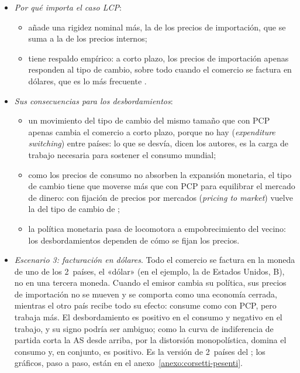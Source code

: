 \documentclass[11pt]{article}
\begin{document}
\begin{itemize}
\item \emph{Por qué importa el caso LCP}:
  \begin{itemize}
  \item añade una rigidez nominal más, la de los precios de importación, que se suma a la de los precios internos;
  \item tiene respaldo empírico: a corto plazo, los precios de importación apenas responden al tipo de cambio, sobre todo cuando el comercio se factura en dólares, que es lo más frecuente\nocite{Gopinath2020DCP} .
  \end{itemize}
\item \emph{Sus consecuencias para los desbordamientos}:
  \begin{itemize}
  \item un movimiento del tipo de cambio del mismo tamaño que con PCP apenas cambia el comercio a corto plazo, porque no hay  (\emph{expenditure switching}) entre países: lo que se desvía, dicen los autores, es la carga de trabajo necesaria para sostener el consumo mundial;
  \item como los precios de consumo no absorben la expansión monetaria, el tipo de cambio tiene que moverse más que con PCP para equilibrar el mercado de dinero: con fijación de precios por mercados (\emph{pricing to market}) vuelve la  del tipo de cambio de \nocite{BettsDevereux2000} ;
  \item la política monetaria pasa de locomotora a empobrecimiento del vecino: los desbordamientos dependen de cómo se fijan los precios.
  \end{itemize}
\item \emph{Escenario 3: facturación en dólares}. Todo el comercio se factura en la moneda de uno de los 2~países, el «dólar» (en el ejemplo, la de Estados Unidos, B), no en una tercera moneda. Cuando el emisor cambia su política, sus precios de importación no se mueven y se comporta como una economía cerrada, mientras el otro país recibe todo su efecto: consume como con PCP, pero trabaja más. El desbordamiento es positivo en el consumo y negativo en el trabajo, y su signo podría ser ambiguo; como la curva de indiferencia de partida corta la AS desde arriba, por la distorsión monopolística, domina el consumo y, en conjunto, es positivo. Es la versión de 2~países del \nocite{Gopinath2020DCP}; los gráficos, paso a paso, están en el anexo~\ref{anexo:corsetti-pesenti}.
\end{itemize}
\end{document}
